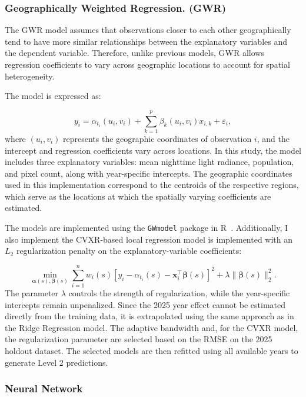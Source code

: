 \documentclass[11pt]{article} %
\begin{document}
\subsubsection{Geographically Weighted Regression. (GWR)}

The GWR model assumes that observations closer to each other geographically tend to have more similar relationships between the explanatory variables and the dependent variable. Therefore, unlike previous models, GWR allows regression coefficients to vary across geographic locations to account for spatial heterogeneity.

The model is expressed as:

\[
y_i=\alpha_{t_i}(u_i,v_i)+
\sum_{k=1}^{p}\beta_k(u_i,v_i)x_{i,k}
+\varepsilon_i,
\]
where \((u_i,v_i)\) represents the geographic coordinates of observation \(i\), and the intercept and regression coefficients vary across locations. In this study, the model includes three explanatory variables: mean nighttime light radiance, population, and pixel count, along with year-specific intercepts. The geographic coordinates used in this implementation correspond to the centroids of the respective regions, which serve as the locations at which the spatially varying coefficients are estimated.

The models are implemented using the \texttt{GWmodel} package in R~\parencite{gol-lu-char:GWmodel}. Additionally, I also implement the CVXR-based local regression model is implemented with an \(L_2\) regularization penalty on the explanatory-variable coefficients:

\[
\min_{\boldsymbol{\alpha}(s),\boldsymbol{\beta}(s)}
\sum_{i=1}^{n}w_i(s)
\left[y_i-\alpha_{t_i}(s)-\mathbf{x}_i^\top\boldsymbol{\beta}(s)\right]^2
+\lambda\|\boldsymbol{\beta}(s)\|_2^2.
\]
The parameter \(\lambda\) controls the strength of regularization, while the year-specific intercepts remain unpenalized. Since the 2025 year effect cannot be estimated directly from the training data, it is extrapolated using the same approach as in the Ridge Regression model. The adaptive bandwidth and, for the CVXR model, the regularization parameter are selected based on the RMSE on the 2025 holdout dataset. The selected models are then refitted using all available years to generate Level 2 predictions.

\subsubsection{Neural Network}
\end{document}
